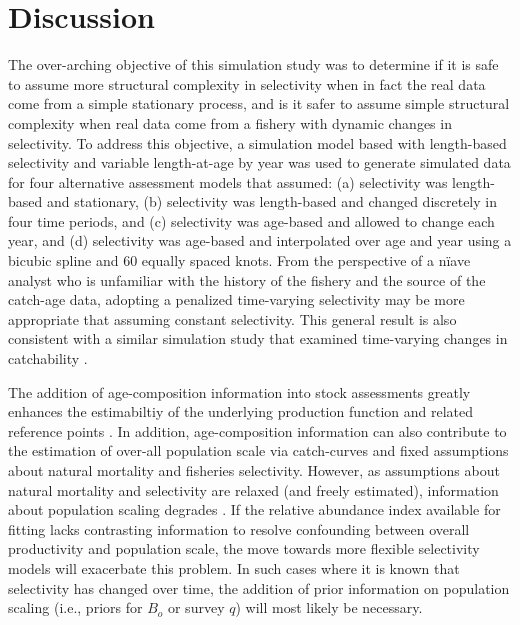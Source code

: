 \section*{Discussion} %
\label{sec:discussion}

The over-arching objective of this simulation study was to determine if it is safe to assume more structural complexity in selectivity when in fact the real data come from a simple stationary process, and is it safer to assume simple structural complexity when real data come from a fishery with dynamic changes in selectivity.  To address this objective, a simulation model based with length-based selectivity and variable length-at-age by year was used to generate simulated data for four alternative assessment models that assumed: (a) selectivity was length-based and stationary, (b) selectivity was length-based and changed discretely in four time periods, and (c) selectivity was age-based and allowed to change each year, and (d) selectivity was age-based and interpolated over age and year using a bicubic spline and 60 equally spaced knots.  From the perspective of a n\"iave analyst who is unfamiliar with the history of the fishery and the source of the catch-age data, adopting a penalized time-varying selectivity may be more appropriate that assuming constant selectivity.  This general result is also consistent with a similar simulation study that examined time-varying changes in catchability \citep{wilberg2006performance}.

The addition of age-composition information into stock assessments greatly enhances the estimabiltiy of the underlying production function and related reference points \citep{magnusson2007mfd}.  In addition, age-composition information can also contribute to the estimation of over-all population scale via catch-curves and fixed assumptions about natural mortality and fisheries selectivity.  However, as assumptions about natural mortality and selectivity are relaxed (and freely estimated), information about population scaling degrades \citep{hilborn1992quantitative}. If the relative abundance index available for fitting lacks contrasting information to resolve confounding between overall productivity and population scale, the move towards more flexible selectivity models will exacerbate this problem.  In such cases where it is known that selectivity has changed over time, the addition of prior information on population scaling (i.e., priors for $B_o$ or survey $q$) will most likely be necessary. 

